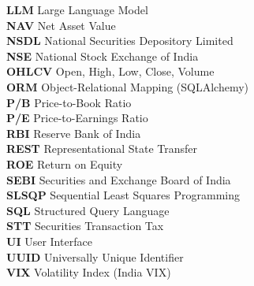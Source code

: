 \documentclass[12pt, a4paper, openright, twoside]{report}
\begin{document}
\begin{center}
\begin{tabbing}
    \textbf{LLM} \> Large Language Model \\
    \textbf{NAV} \> Net Asset Value \\
    \textbf{NSDL} \> National Securities Depository Limited \\
    \textbf{NSE} \> National Stock Exchange of India \\
    \textbf{OHLCV} \> Open, High, Low, Close, Volume \\
    \textbf{ORM} \> Object-Relational Mapping (SQLAlchemy) \\
    \textbf{P/B} \> Price-to-Book Ratio \\
    \textbf{P/E} \> Price-to-Earnings Ratio \\
    \textbf{RBI} \> Reserve Bank of India \\
    \textbf{REST} \> Representational State Transfer \\
    \textbf{ROE} \> Return on Equity \\
    \textbf{SEBI} \> Securities and Exchange Board of India \\
    \textbf{SLSQP} \> Sequential Least Squares Programming \\
    \textbf{SQL} \> Structured Query Language \\
    \textbf{STT} \> Securities Transaction Tax \\
    \textbf{UI} \> User Interface \\
    \textbf{UUID} \> Universally Unique Identifier \\
    \textbf{VIX} \> Volatility Index (India VIX)
\end{tabbing}
\end{center}

\cleardoublepage

\newpage
\thispagestyle{empty}
\null
\clearpage

\restoregeometry
{}
\raggedbottom
{}
\setcounter{page}{1}








\cleardoublepage


\end{document}
